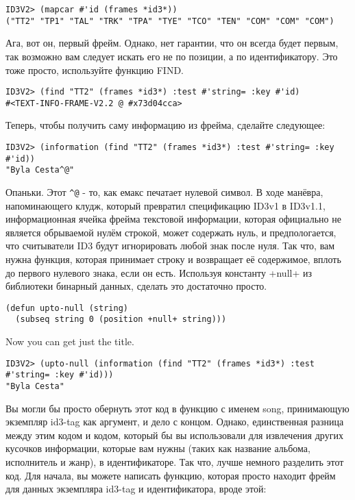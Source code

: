 \begin{lstlisting}
ID3V2> (mapcar #'id (frames *id3*))
("TT2" "TP1" "TAL" "TRK" "TPA" "TYE" "TCO" "TEN" "COM" "COM" "COM")
\end{lstlisting}

Ага, вот он, первый фрейм. Однако, нет гарантии, что он всегда будет первым, так возможно
вам следует искать его не по позиции, а по идентификатору. Это тоже просто, используйте
функцию FIND.

\begin{lstlisting}
ID3V2> (find "TT2" (frames *id3*) :test #'string= :key #'id)
#<TEXT-INFO-FRAME-V2.2 @ #x73d04cca>
\end{lstlisting}

Теперь, чтобы получить саму информацию из фрейма, сделайте следующее:

\begin{lstlisting}
ID3V2> (information (find "TT2" (frames *id3*) :test #'string= :key #'id))
"Byla Cesta^@"
\end{lstlisting}

Опаньки. Этот \lstinline!^@! - то, как емакс печатает нулевой символ. В ходе манёвра,
напоминающего клудж, который превратил спецификацию ID3v1 в ID3v1.1, информационная ячейка
фрейма текстовой информации, которая официально не является обрываемой нулём строкой,
может содержать нуль, и предпологается, что считыватели ID3 будут игнорировать любой знак
после нуля. Так что, вам нужна функция, которая принимает строку и возвращает её
содержимое, вплоть до первого нулевого знака, если он есть. Используя константу +null+ из
библиотеки бинарный данных, сделать это достаточно просто.

\begin{lstlisting}
(defun upto-null (string)
  (subseq string 0 (position +null+ string)))
\end{lstlisting}

Now you can get just the title.

\begin{lstlisting}
ID3V2> (upto-null (information (find "TT2" (frames *id3*) :test #'string= :key #'id)))
"Byla Cesta"
\end{lstlisting}

Вы могли бы просто обернуть этот код в функцию с именем song, принимающую экземпляр
id3-tag как аргумент, и дело с концом. Однако, единственная разница между этим кодом и
кодом, который бы вы использовали для извлечения других кусочков информации, которые вам
нужны (таких как название альбома, исполнитель и жанр), в идентификаторе. Так что, лучше
немного разделить этот код. Для начала, вы можете написать функцию, которая просто находит
фрейм для данных экземпляра id3-tag и идентификатора, вроде этой:

